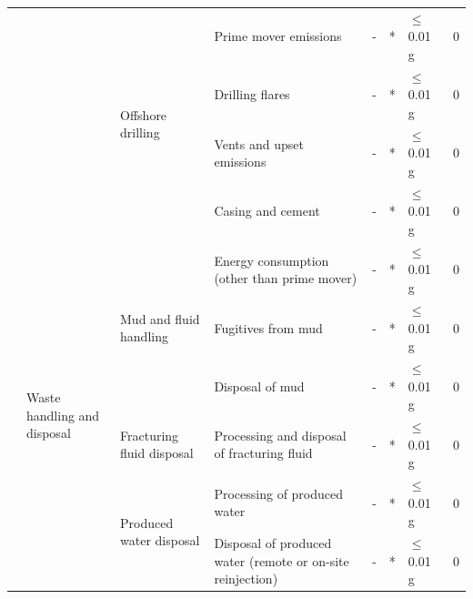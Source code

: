 \documentclass[11pt]{report}
\begin{document}
\begin{landscape}
\begin{table}
\begin{scriptsize}
\begin{tabular}{|p{}|p{}|p{}|p{}|r|p{}|p{}|p{}|}
\cline{3-8}
& & \multirow{4}{0.09\columnwidth}{Offshore drilling} & Prime mover emissions & - & * & $\leq$ 0.01 g & 0\\
\cline{4-8}
& & & Drilling flares & - & * & $\leq$ 0.01 g & 0\\
\cline{4-8}
& & & Vents and upset emissions & - & * & $\leq$ 0.01 g & 0\\
\cline{4-8}
& & & Casing and cement & - & * & $\leq$ 0.01 g & 0\\
\cline{2-8}
& \multirow{6}{0.09\columnwidth}{Waste handling and disposal} & \multirow{3}{0.09\columnwidth}{Mud and fluid handling} & Energy consumption (other than prime mover) & - & * & $\leq$ 0.01 g & 0\\
\cline{4-8}
& & & Fugitives from mud & - & * & $\leq$ 0.01 g & 0\\
\cline{4-8}
& & & Disposal of mud & - & * & $\leq$ 0.01 g & 0\\
\cline{3-8}
& & Fracturing fluid disposal & Processing and disposal of fracturing fluid & - & * & $\leq$ 0.01 g & 0\\
\cline{3-8}
& & \multirow{2}{0.09\columnwidth}{Produced water disposal} & Processing of produced water & - & * & $\leq$ 0.01 g & 0\\
\cline{4-8}
& & & Disposal of produced water (remote or on-site reinjection) & - & * & $\leq$ 0.01 g & 0\\
\hline
\end{tabular}
\end{scriptsize}
\end{table}



\end{landscape}
\end{document}
